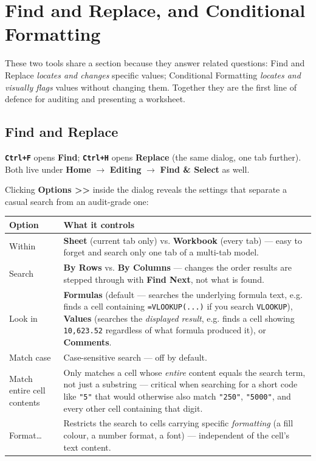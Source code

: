 \documentclass[11pt,a4paper]{article}
\newcommand{\key}[1]{\texttt{\colorbox{black!8}{\textbf{#1}}}}
\begin{document}
\section{Find and Replace, and Conditional Formatting}

These two tools share a section because they answer related questions: Find and Replace \emph{locates and changes} specific values; Conditional Formatting \emph{locates and visually flags} values without changing them. Together they are the first line of defence for auditing and presenting a worksheet.

\subsection{Find and Replace}
\label{sec:findreplace}

\begin{formulasyntax}
\key{Ctrl+F} opens \textbf{Find}; \key{Ctrl+H} opens \textbf{Replace} (the same dialog, one tab further). Both live under \textbf{Home} $\rightarrow$ \textbf{Editing} $\rightarrow$ \textbf{Find \& Select} as well.
\end{formulasyntax}

Clicking \textbf{Options >>} inside the dialog reveals the settings that separate a casual search from an audit-grade one:

\begin{center}
\begin{tabular}{@{}L{3.2cm}L{9.6cm}@{}}
\toprule
\textbf{Option} & \textbf{What it controls} \\
\midrule
Within & \textbf{Sheet} (current tab only) vs. \textbf{Workbook} (every tab) --- easy to forget and search only one tab of a multi-tab model. \\
Search & \textbf{By Rows} vs. \textbf{By Columns} --- changes the order results are stepped through with \textbf{Find Next}, not what is found. \\
Look in & \textbf{Formulas} (default --- searches the underlying formula text, e.g. finds a cell containing \texttt{=VLOOKUP(...)} if you search \texttt{VLOOKUP}), \textbf{Values} (searches the \emph{displayed result}, e.g. finds a cell showing \texttt{10,623.52} regardless of what formula produced it), or \textbf{Comments}. \\
Match case & Case-sensitive search --- off by default. \\
Match entire cell contents & Only matches a cell whose \emph{entire} content equals the search term, not just a substring --- critical when searching for a short code like \texttt{"5"} that would otherwise also match \texttt{"250"}, \texttt{"5000"}, and every other cell containing that digit. \\
Format\dots & Restricts the search to cells carrying specific \emph{formatting} (a fill colour, a number format, a font) --- independent of the cell's text content. \\
\bottomrule
\end{tabular}
\end{center}
\end{document}
